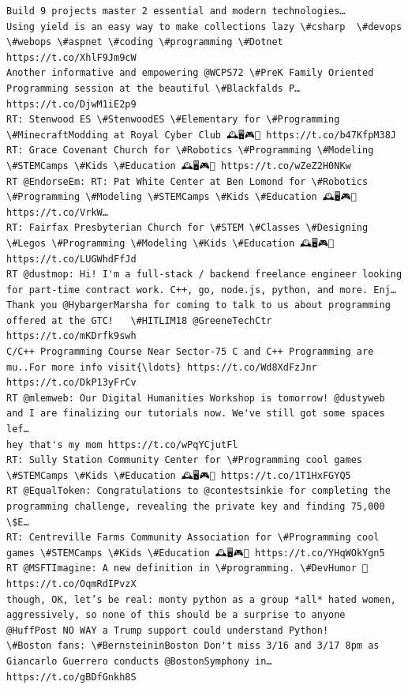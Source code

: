 \documentclass[11pt]{article}
\begin{document}
\begin{Verbatim}[commandchars=\\\{\}]
Build 9 projects master 2 essential and modern technologies…
Using yield is an easy way to make collections lazy \#csharp  \#devops \#webops \#aspnet \#coding \#programming \#Dotnet https://t.co/XhlF9Jm9cW
Another informative and empowering @WCPS72 \#PreK Family Oriented Programming session at the beautiful \#Blackfalds P… https://t.co/DjwM1iE2p9
RT: Stenwood ES \#StenwoodES \#Elementary for \#Programming \#MinecraftModding at Royal Cyber Club 🕰️🖥️🎮💎 https://t.co/b47KfpM38J
RT: Grace Covenant Church for \#Robotics \#Programming \#Modeling \#STEMCamps \#Kids \#Education 🕰️🖥️🎮💎 https://t.co/wZeZ2H0NKw
RT @EndorseEm: RT: Pat White Center at Ben Lomond for \#Robotics \#Programming \#Modeling \#STEMCamps \#Kids \#Education 🕰️🖥️🎮💎 https://t.co/VrkW…
RT: Fairfax Presbyterian Church for \#STEM \#Classes \#Designing \#Legos \#Programming \#Modeling \#Kids \#Education 🕰️🖥️🎮💎 https://t.co/LUGWhdFfJd
RT @dustmop: Hi! I'm a full-stack / backend freelance engineer looking for part-time contract work. C++, go, node.js, python, and more. Enj…
Thank you @HybargerMarsha for coming to talk to us about programming offered at the GTC!   \#HITLIM18 @GreeneTechCtr https://t.co/mKDrfk9swh
C/C++ Programming Course Near Sector-75 C and C++ Programming are mu..For more info visit{\ldots} https://t.co/Wd8XdFzJnr https://t.co/DkP13yFrCv
RT @mlemweb: Our Digital Humanities Workshop is tomorrow! @dustyweb and I are finalizing our tutorials now. We've still got some spaces lef…
hey that's my mom https://t.co/wPqYCjutFl
RT: Sully Station Community Center for \#Programming cool games \#STEMCamps \#Kids \#Education 🕰️🖥️🎮💎 https://t.co/1T1HxFGYQ5
RT @EqualToken: Congratulations to @contestsinkie for completing the programming challenge, revealing the private key and finding 75,000 \$E…
RT: Centreville Farms Community Association for \#Programming cool games \#STEMCamps \#Kids \#Education 🕰️🖥️🎮💎 https://t.co/YHqWOkYgn5
RT @MSFTImagine: A new definition in \#programming. \#DevHumor 🤣 https://t.co/OqmRdIPvzX
though, OK, let’s be real: monty python as a group *all* hated women, aggressively, so none of this should be a surprise to anyone
@HuffPost NO WAY a Trump support could understand Python!
\#Boston fans: \#BernsteininBoston Don't miss 3/16 and 3/17 8pm as Giancarlo Guerrero conducts @BostonSymphony in… https://t.co/gBDfGnkh8S

    \end{Verbatim}


    
    
    
    
\end{document}

